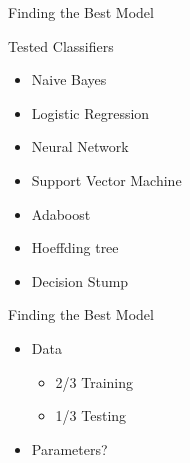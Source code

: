 \begin{frame}{Finding the Best Model}

Tested Classifiers

\begin{itemize}
\item Naive Bayes 
\item Logistic Regression
\item Neural Network
\item Support Vector Machine
\item Adaboost
\item Hoeffding tree
\item Decision Stump
\end{itemize}
\end{frame}

\begin{frame}{Finding the Best Model}
\begin{itemize}
\item Data \begin{itemize}
		\item 2/3 Training
		\item 1/3 Testing
           \end{itemize}
\item Parameters? 

\end{itemize}

\end{frame}

